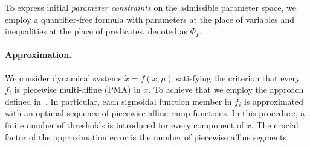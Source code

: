 \documentclass{llncs}
\begin{document}
To express initial \emph{parameter constraints} on the admissible parameter space, we employ a quantifier-free formula with parameters at the place of variables and inequalities at the place of predicates, denoted as $\Phi_I$.  

\paragraph{Approximation.} 
We consider dynamical systems $\dot x = f(x, \mu)$ satisfying the criterion that every $f_i$ is piecewise multi-affine (PMA) in $x$. To achieve that we employ the approach defined in~\cite{GrosuBFGGSB11}. In particular, each sigmoidal function member in $f_i$ is approximated with an optimal sequence of piecewise affine ramp functions. In this procedure, a finite number of thresholds is introduced for every component of $x$. %
The crucial factor of the approximation error is the number of piecewise affine segments.

\end{document}
